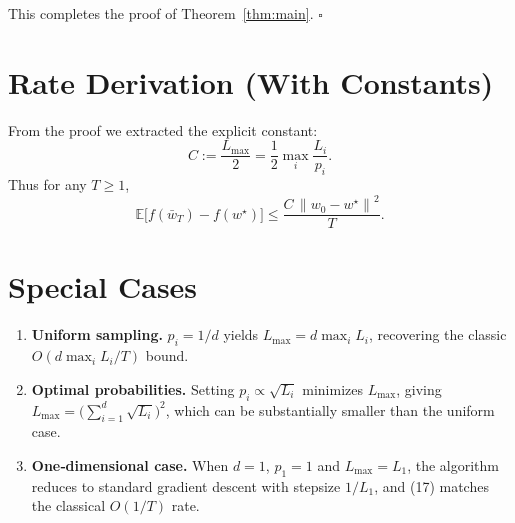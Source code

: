 \documentclass{article}
\newcommand{\E}{\mathbb{E}}
\newcommand{\norm}[1]{\left\lVert#1\right\rVert}
\begin{document}
This completes the proof of Theorem~\ref{thm:main}. \hfill $\square$

\section*{Rate Derivation (With Constants)}
From the proof we extracted the explicit constant:
\[
C:=\frac{L_{\max}}{2}=
\frac{1}{2}\max_{i}\frac{L_i}{p_i}.
\]
Thus for any $T\ge1$,
\[
\E\!\bigl[f(\bar w_T)-f(w^{\star})\bigr]\le
\frac{C\,\norm{w_0-w^{\star}}^{2}}{T}.
\]

\section*{Special Cases}
\begin{enumerate}[leftmargin=*]
\item \textbf{Uniform sampling.} $p_i=1/d$ yields $L_{\max}=d\max_i L_i$, recovering the classic $O(d\max_i L_i/T)$ bound.
\item \textbf{Optimal probabilities.} Setting $p_i\propto \sqrt{L_i}$ minimizes $L_{\max}$, giving $L_{\max}= \bigl(\sum_{i=1}^{d}\sqrt{L_i}\bigr)^{2}$, which can be substantially smaller than the uniform case.
\item \textbf{One‑dimensional case.} When $d=1$, $p_1=1$ and $L_{\max}=L_1$, the algorithm reduces to standard gradient descent with stepsize $1/L_1$, and (17) matches the classical $O(1/T)$ rate.
\end{enumerate}
\end{document}
